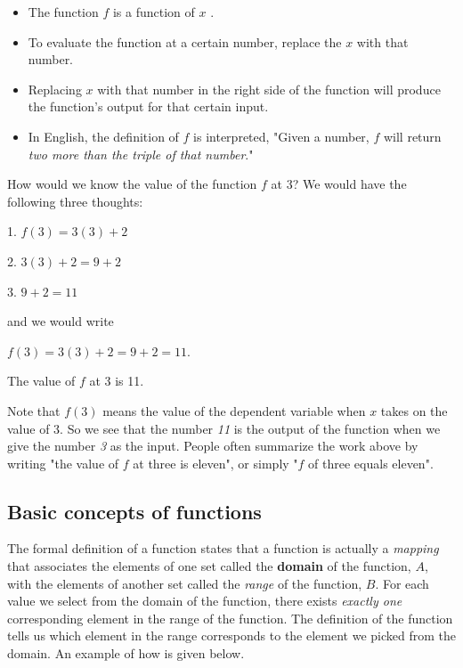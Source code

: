 \begin{itemize}
    \item The function $f$ is a function of $x$ .
    \item To evaluate the function at a certain number, replace the $x$ with that number.
    \item Replacing $x$ with that number in the right side of the function will produce the function's output for that certain input.
    \item In English, the definition of $f$ is interpreted, "Given a number, $f$ will return \textit{two more than the triple of that number}."
\end{itemize}

How would we know the value of the function $f$ at 3? We would have the following three thoughts:



1.  $f(3)=3(3)+2$

2.  $3(3)+2=9+2$

3.  $9+2=11$



and we would write



$f(3)=3(3)+2=9+2=11$.



The value of $f$ at 3 is 11.



Note that $f(3)$ means the value of the dependent variable when $x$ takes on the value of
3. So we see that the number \textit{11} is the output of the function when we give the
number \textit{3} as the input. People often summarize the work above by writing "the
value of $f$ at three is eleven", or simply "$f$ of three equals eleven".




\subsection{Basic concepts of functions}
\label{sss:basi-1380}




The formal definition of a function states that a function is actually a \textit{mapping}
that associates the elements of one set called the \textbf{domain} of the function, $A$,
with the elements of another set called the \textit{range} of the function, $B$. For each
value we select from the domain of the function, there exists \textit{exactly one}
corresponding element in the range of the function. The definition of the function tells
us which element in the range corresponds to the element we picked from the domain. An
example of how is given below.




